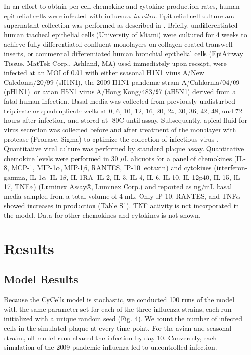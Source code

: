 \documentclass[preprint,10pt,numbers]{elsarticle}
\begin{document}
In an effort to obtain per-cell chemokine and cytokine production rates, human epithelial cells were infected with influenza \textit{in vitro}.  Epithelial cell culture and supernatant collection was performed as described in \citep{Mitchell2011}.  Briefly, undifferentiated human tracheal epithelial cells (University of Miami) were cultured for 4 weeks to achieve fully differentiated confluent monolayers on collagen-coated transwell inserts, or commercial differentiated human bronchial epithelial cells (EpiAirway Tissue, MatTek Corp., Ashland, MA) used immediately upon receipt, were infected at an MOI of 0.01 with either seasonal H1N1 virus A/New Caledonia/20/99 (sH1N1), the 2009 H1N1 pandemic strain A/California/04/09 (pH1N1), or avian H5N1 virus A/Hong Kong/483/97 (aH5N1) derived from a fatal human infection.  Basal media was collected from previously undisturbed triplicate or quadruplicate wells at 0, 6, 10, 12, 16, 20, 24, 30, 36, 42, 48, and 72 hours after infection, and stored at -80C until assay.  Subsequently, apical fluid for virus secretion was collected before and after treatment of the monolayer with protease (Pronase, Sigma) to optimize the collection of infectious virus \citep{Mitchell2011}.  Quantitative viral culture was performed by standard plaque assay.  Quantitative chemokine levels were performed in 30 $\mu$L aliquots for a panel of chemokines (IL-8, MCP-1, MIP-1$\alpha$, MIP-1$\beta$, RANTES, IP-10, eotaxin) and cytokines (interferon-gamma, IL-1$\alpha$, IL-1$\beta$, IL-1RA, IL-2, IL-3, IL-4, IL-6, IL-10, IL-12p40, IL-15, IL-17, TNF$\alpha$) (Luminex Assay®, Luminex Corp.) and reported as ng/mL basal media sampled from a total volume of 4 mL.  Only IP-10, RANTES, and TNF$\alpha$ showed increases in production (Table S1).  TNF activity is not incorporated in the model.  Data for other chemokines and cytokines is not shown.



\section*{Results}

\subsection*{Model Results}

Because the CyCells model is stochastic, we conducted 100 runs of the model with the same parameter set for each of the three influenza strains, each run initialized with a unique random seed (Fig. 4).  We count the number of infected cells in the simulated plaque at every time point.  For the avian and seasonal strains, all model runs cleared the infection by day 10.  Conversely, each simulation of the 2009 pandemic influenza led to uncontrolled infection. 
\end{document}
